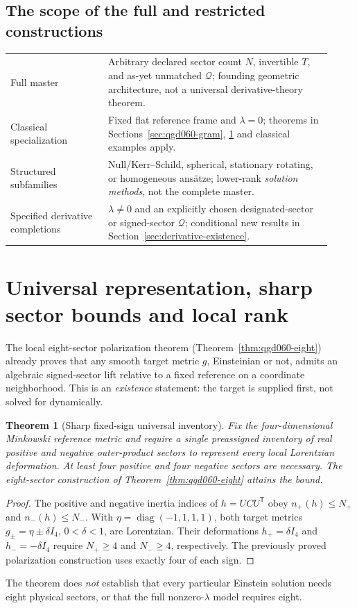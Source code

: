 \documentclass[11pt,a4paper]{article}
\newtheorem{theorem}{Theorem}[section]
\begin{document}
\subsection{The scope of the full and restricted constructions}\label{sec:regimes}
\begin{center}\small
\begin{tabular}{@{}p{0.28\linewidth}p{0.64\linewidth}@{}}\toprule
Full master & Arbitrary declared sector count \(N\), invertible \(T\), and as-yet unmatched \(\mathcal Q\); founding geometric architecture, not a universal derivative-theory theorem.\\
Classical specialization & Fixed flat reference frame and \(\lambda=0\); theorems in Sections~\ref{sec:qgd060-gram}, \ref{sec:representation-strengthening} and classical examples apply.\\
Structured subfamilies & Null/Kerr--Schild, spherical, stationary rotating, or homogeneous ans\"atze; lower-rank \emph{solution methods}, not the complete master.\\
Specified derivative completions & \(\lambda\ne0\) and an explicitly chosen designated-sector or signed-sector \(\mathcal Q\); conditional new results in Section~\ref{sec:derivative-existence}.\\
\bottomrule\end{tabular}
\end{center}

\section{Universal representation, sharp sector bounds and local rank}\label{sec:representation-strengthening}
The local eight-sector polarization theorem (Theorem~\ref{thm:qgd060-eight}) already proves that any smooth target metric \(g\), Einsteinian or not, admits an algebraic signed-sector lift relative to a fixed reference on a coordinate neighborhood. This is an \emph{existence} statement: the target is supplied first, not solved for dynamically.

\begin{theorem}[Sharp fixed-sign universal inventory]\label{thm:sharp-eight}
Fix the four-dimensional Minkowski reference metric and require a \emph{single preassigned inventory} of real positive and negative outer-product sectors to represent every local Lorentzian deformation. At least four positive and four negative sectors are necessary. The eight-sector construction of Theorem~\ref{thm:qgd060-eight} attains the bound.
\end{theorem}
\begin{proof}
The positive and negative inertia indices of \(h=UCU^{\mathsf T}\) obey \(n_+(h)\le N_+\) and \(n_-(h)\le N_-\). With \(\eta=\operatorname{diag}(-1,1,1,1)\), both target metrics \(g_\pm=\eta\pm\delta I_4\), \(0<\delta<1\), are Lorentzian. Their deformations \(h_+=\delta I_4\) and \(h_-=-\delta I_4\) require \(N_+\ge4\) and \(N_-\ge4\), respectively. The previously proved polarization construction uses exactly four of each sign.\end{proof}
\noindent The theorem does \emph{not} establish that every particular Einstein solution needs eight physical sectors, or that the full nonzero-\(\lambda\) model requires eight.
\end{document}
